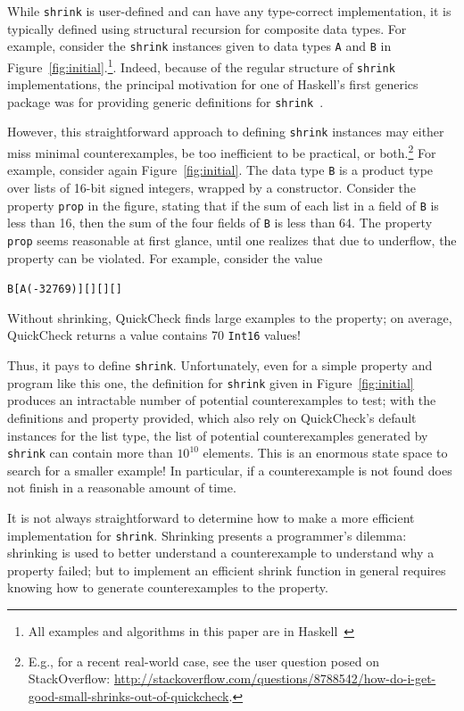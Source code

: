 \documentclass[10pt]{sigplanconf}
\newenvironment{code}{\begin{alltt}}{\end{alltt}}
\newcommand{\ttp}[1]{\texttt{#1}}
\begin{document}
While \ttp{shrink} is user-defined and can have any type-correct implementation,
it is typically defined using structural recursion for composite data types.
For example, consider the \ttp{shrink} instances given to data types \ttp{A} and
\ttp{B} in Figure~\ref{fig:initial}.\footnote{All examples and algorithms in
  this paper are in Haskell~\cite{haskell98}}.  Indeed, because of the regular
structure of \ttp{shrink} implementations, the principal motivation for one of
Haskell's first generics package was for providing generic definitions for
\ttp{shrink}~\cite{syb}.

However, this straightforward approach to defining \ttp{shrink} instances may
either miss minimal counterexamples, be too inefficient to be practical, or
both.\footnote{E.g., for a recent real-world case, see the user question posed
  on StackOverflow:
  \url{http://stackoverflow.com/questions/8788542/how-do-i-get-good-small-shrinks-out-of-quickcheck}.}
For example, consider again Figure~\ref{fig:initial}.  The data type \ttp{B} is
a product type over lists of 16-bit signed integers, wrapped by a constructor.
Consider the property \ttp{prop} in the figure, stating that if the sum of each
list in a field of \ttp{B} is less than 16, then the sum of the four fields of
\ttp{B} is less than 64.  The property \ttp{prop} seems reasonable at first
glance, until one realizes that due to underflow, the property can be violated.
For example, consider the value
%
\begin{code}
B [A (-32769)] [] [] []
\end{code}
%
\noindent
Without shrinking, QuickCheck finds large examples to the property; on average,
QuickCheck returns a value contains 70 \ttp{Int16} values!

Thus, it pays to define \ttp{shrink}.  Unfortunately, even for a simple property
and program like this one, the definition for \ttp{shrink} given in
Figure~\ref{fig:initial} produces an intractable number of potential
counterexamples to test; with the definitions and property provided, which also
rely on QuickCheck's default instances for the list type, the list of potential
counterexamples generated by \ttp{shrink} can contain more than $10^{10}$
elements.  This is an enormous state space to search for a smaller example!  In
particular, if a counterexample is not found does not finish in a reasonable
amount of time.

It is not always straightforward to determine how to make a more efficient
implementation for \ttp{shrink}.  Shrinking presents a programmer's dilemma:
shrinking is used to better understand a counterexample to understand why a
property failed; but to implement an efficient shrink function in general
requires knowing how to generate counterexamples to the property.
\end{document}
